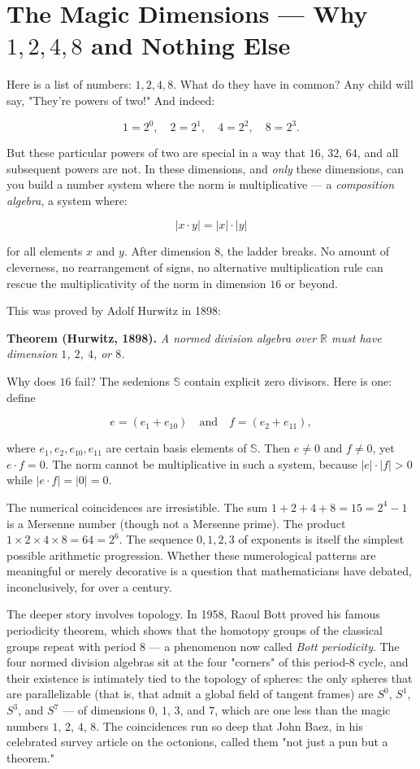\documentclass[11pt,twoside,openright]{book}
\theoremstyle{definition}
\theoremstyle{remark}
\begin{document}
\section{The Magic Dimensions --- Why $1, 2, 4, 8$ and Nothing Else}

Here is a list of numbers: $1, 2, 4, 8$. What do they have in common? Any child will say, "They're powers of two!" And indeed:

\[1 = 2^0, \quad 2 = 2^1, \quad 4 = 2^2, \quad 8 = 2^3.\]

But these particular powers of two are special in a way that $16$, $32$, $64$, and all subsequent powers are not. In these dimensions, and \textit{only} these dimensions, can you build a number system where the norm is multiplicative --- a \textit{composition algebra}, a system where:

\[|x \cdot y| = |x| \cdot |y|\]

for all elements $x$ and $y$. After dimension $8$, the ladder breaks. No amount of cleverness, no rearrangement of signs, no alternative multiplication rule can rescue the multiplicativity of the norm in dimension $16$ or beyond.

This was proved by Adolf Hurwitz in 1898:

\textbf{Theorem (Hurwitz, 1898).} \textit{A normed division algebra over $\mathbb{R}$ must have dimension $1$, $2$, $4$, or $8$.}


Why does $16$ fail? The sedenions $\mathbb{S}$ contain explicit zero divisors. Here is one: define

\[e = (e_1 + e_{10}) \quad \text{and} \quad f = (e_2 + e_{11}),\]

where $e_1, e_2, e_{10}, e_{11}$ are certain basis elements of $\mathbb{S}$. Then $e \neq 0$ and $f \neq 0$, yet $e \cdot f = 0$. The norm cannot be multiplicative in such a system, because $|e| \cdot |f| > 0$ while $|e \cdot f| = |0| = 0$.

The numerical coincidences are irresistible. The sum $1 + 2 + 4 + 8 = 15 = 2^4 - 1$ is a Mersenne number (though not a Mersenne prime). The product $1 \times 2 \times 4 \times 8 = 64 = 2^6$. The sequence $0, 1, 2, 3$ of exponents is itself the simplest possible arithmetic progression. Whether these numerological patterns are meaningful or merely decorative is a question that mathematicians have debated, inconclusively, for over a century.


The deeper story involves topology. In 1958, Raoul Bott proved his famous periodicity theorem, which shows that the homotopy groups of the classical groups repeat with period $8$ --- a phenomenon now called \textit{Bott periodicity}. The four normed division algebras sit at the four "corners" of this period-$8$ cycle, and their existence is intimately tied to the topology of spheres: the only spheres that are parallelizable (that is, that admit a global field of tangent frames) are $S^0$, $S^1$, $S^3$, and $S^7$ --- of dimensions $0$, $1$, $3$, and $7$, which are one less than the magic numbers $1$, $2$, $4$, $8$. The coincidences run so deep that John Baez, in his celebrated survey article on the octonions, called them "not just a pun but a theorem."
\end{document}

